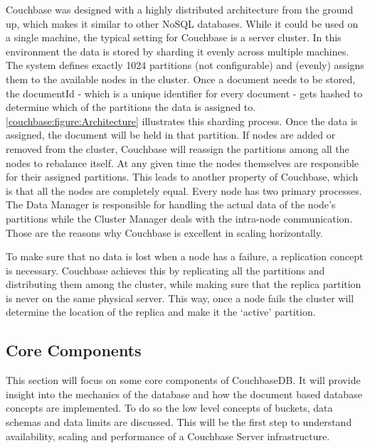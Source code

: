 Couchbase was designed with a highly distributed architecture from the ground up, which makes it similar to other NoSQL databases. While it could be used on a single machine, the typical setting for Couchbase is a server cluster.
In this environment the data is stored by sharding it evenly across multiple machines. The system defines exactly 1024 partitions (not configurable) and (evenly) assigns them to the available nodes in the cluster. Once a document needs to be stored, the documentId - which is a unique identifier for every document - gets hashed to determine which of the partitions the data is assigned to. \autoref{couchbase:figure:Architecture} illustrates this sharding process. Once the data is assigned, the document will be held in that partition. If nodes are added or removed from the cluster, Couchbase will reassign the partitions among all the nodes to rebalance itself. At any given time the nodes themselves are responsible for their assigned partitions. This leads to another property of Couchbase, which is that all the nodes are completely equal. Every node has two primary processes. The Data Manager is responsible for handling the actual data of the node's partitions while the Cluster Manager deals with the intra-node communication. Those are the reasons why Couchbase is excellent in scaling horizontally. \parencite{objelean}

To make sure that no data is lost when a node has a failure, a replication concept is necessary. Couchbase achieves this by replicating all the partitions and distributing them among the cluster, while making sure that the replica partition is never on the same physical server. This way, once a node fails the cluster will determine the location of the replica and make it the ‘active’ partition.

\subsection{Core Components}
\label{couchbase:section:corecomponents}
This section will focus on some core components of CouchbaseDB. It will provide insight into the mechanics of the database and how the document based database concepts are implemented. To do so the low level concepts of buckets, data schemas and data limits are discussed. This will be the first step to understand availability, scaling and performance of a Couchbase Server infrastructure.
